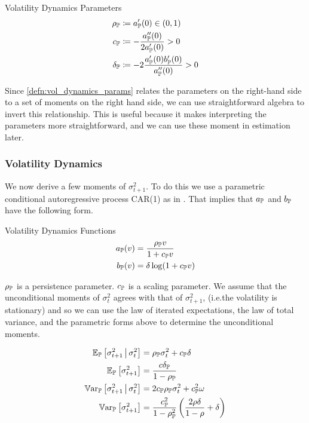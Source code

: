 \documentclass[11pt, letterpaper, twoside, final]{article}
\begin{document}
\begin{defn}{Volatility Dynamics Parameters}
    \label{defn:vol_dynamics_params}
    \begin{align}
        \rho_{\mathbb{P}} &\coloneqq a_{\mathbb{P}}'(0) \in (0,1) \\
        c_{\mathbb{P}} &\coloneqq - \frac{a_{\mathbb{P}}''(0)}{2 a_{\mathbb{P}}'(0)} > 0 \\
        \delta_{\mathbb{P}} &\coloneqq -2 \frac{a_{\mathbb{P}}'(0) b_{\mathbb{P}}'(0)}{a_{\mathbb{P}}''(0)} > 0 
    \end{align}
\end{defn}

Since \cref{defn:vol_dynamics_params} relates the parameters on the right-hand side to a set of moments on the
right hand side, we can use straightforward algebra to invert this relationship.
This is useful because it makes interpreting the parameters more straightforward, and we can use these moment in
estimation later. 

\subsubsection{Volatility Dynamics}

We now derive a few moments of $\sigma^2_{t+1}$. 
To do this we use a parametric conditional autoregressive process CAR(1) as in \textcite{khrapov2016affine}.
That implies that $a_{\mathbb{P}}$ and $b_{\mathbb{P}}$ have the following form. 

\begin{defn}{Volatility Dynamics Functions}
    \begin{align}
        \label{defn:a_PP}
        a_{\mathbb{P}}(v) &= \frac{\rho_{\mathbb{P}} v}{1 + c_{\mathbb{P}} v} \\
        \label{defn:b_PP}
        b_{\mathbb{P}}(v) &= \delta \log(1 + c_{\mathbb{P}} v)
    \end{align}
\end{defn}

$\rho_{\mathbb{P}}$ is a persistence parameter.
$c_{\mathbb{P}}$ is a scaling parameter.
We assume that the unconditional moments of $\sigma^2_t$ agrees with that of $\sigma^2_{t+1}$, (i.e.\@ the
volatility is stationary) and so we can use the law of iterated expectations, the law of total variance, and the
parametric forms above  to determine the unconditional moments.

\begin{remark} 
    \label{remark:vol_moment_conditions}
    \begin{align}
        \E_{\PP}\left[\sigma^2_{t+1} \mvert \sigma^2_t \right]  &= \rho_{\PP} \sigma^2_t  + c_{\PP} \delta\\
%
        \E_{\PP}\left[\sigma^2_{t+1}\right]  &= \frac{c \delta_{\PP}}{1 - \rho_{\PP}} \\
%
        \Var_{\PP}\left[\sigma^2_{t+1} \mvert \sigma^2_t \right]  &=  2 c_{\PP} \rho_{\PP} \sigma^2_t  + c_{\PP}^2
        \omega \\
%
        \Var_{\PP}\left[\sigma^2_{t+1} \right]  &=  \frac{c_{\PP}^2}{1- \rho_{\PP}^2} \left(\frac{2 \rho \delta}{1
        - \rho}  + \delta \right) 
    \end{align}
\end{remark}
\end{document}
